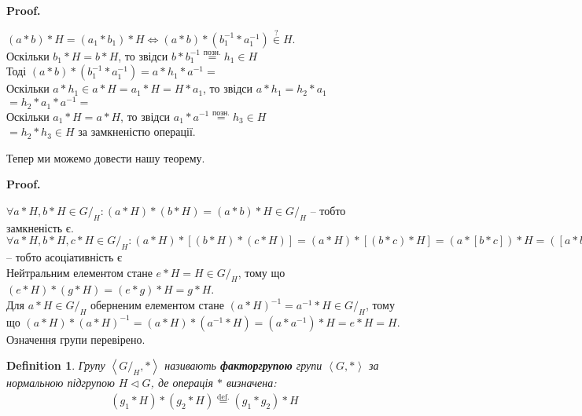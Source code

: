 \documentclass[a4paper, 10pt]{article}
\makeatletter
\theoremstyle{theoremdd}
\theoremstyle{theoremdd}
\newtheorem{definition}[theorem]{Definition}
\theoremstyle{theoremdd}
\theoremstyle{theoremdd}
\theoremstyle{theoremdd}
\theoremstyle{theoremdd}
\theoremstyle{theoremdd}
\theoremstyle{theoremdd}
\theoremstyle{theoremdd}
\theoremstyle{theoremdd}
\theoremstyle{theoremdd}
\theoremstyle{theoremdd}
\theoremstyle{theoremdd}
\theoremstyle{theoremdd}
\theoremstyle{theoremdd}
\renewenvironment{proof}[1][Proof.\\]{\par
\pushQED{\hfill \qed}%
\normalfont \topsep6\p@\@plus6\p@\relax
\trivlist
\item\relax
{\bfseries
#1\@addpunct{.}}\hspace\labelsep\ignorespaces
}{%
\popQED\endtrivlist\@endpefalse
}
\newcommand{\eqbydef}{\overset{\text{def.}}{=}}
\makeatother
\begin{document}
\begin{proof}
$(a*b)*H = (a_1*b_1)*H \iff (a*b)*(b_1^{-1}*a_1^{-1}) \overset{?}{\in} H$.\\
Оскільки $b_1*H = b*H$, то звідси $b*b_1^{-1} \overset{\text{позн.}}{=} h_1 \in H$\\
Тоді $(a*b)*(b_1^{-1}*a_1^{-1}) = a*h_1*a^{-1} \boxed{=}$\\
Оскільки $a*h_1 \in a*H = a_1*H = H*a_1$, то звідси $a*h_1=h_2*a_1$\\
$\boxed{=} h_2*a_1*a^{-1} \boxed{=}$\\
Оскільки $a_1*H = a*H$, то звідси $a_1*a^{-1} \overset{\text{позн.}}{=} h_3 \in H$\\
$\boxed{=} h_2*h_3 \in H$ за замкненістю операції.
\end{proof}

Тепер ми можемо довести нашу теорему.

\begin{proof}
$\forall a*H,b*H \in G/_H: (a*H)*(b*H) = (a*b)*H \in G/_H$ -- тобто замкненість є.\\
$\forall a*H,b*H,c*H \in G/_H: (a*H)*[(b*H)*(c*H)] = (a*H)*[(b*c)*H] = (a*[b*c])*H = ([a*b]*c)*H = [(a*b)*H]*(c*H) = [(a*H)*(b*H)]*(c*H))$ -- тобто асоціативність є\\
Нейтральним елементом стане $e*H = H \in G/_H$, тому що $(e*H)*(g*H) = (e*g)*H = g*H$.\\
Для $a*H \in G/_H$ оберненим елементом стане $(a*H)^{-1} = a^{-1}*H \in G/_H$, тому що $(a*H)*(a*H)^{-1} = (a*H)*(a^{-1}*H) = (a*a^{-1})*H = e*H = H$.\\
Означення групи перевірено.
\end{proof}

\begin{definition}
Групу $\left<G/_H,* \right>$ називають \textbf{факторгрупою} групи $\left<G,* \right>$ за нормальною підгрупою $H \triangleleft G$, де операція $*$ визначена:
\begin{align*}
(g_1*H) * (g_2*H) \eqbydef (g_1*g_2)*H
\end{align*}
\end{definition}
\end{document}

